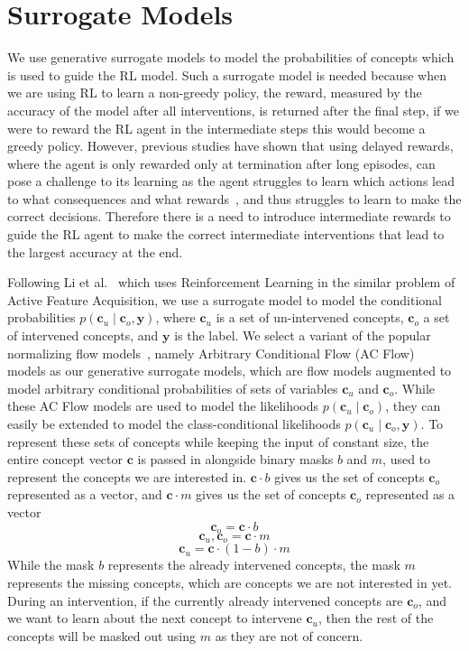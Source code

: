 
\section{Surrogate Models}\label{method:surrogate}

We use generative surrogate models to model the probabilities of concepts which is used
to guide the RL model. 
Such a surrogate model is needed because
when we are using RL to learn 
a non-greedy policy, the reward, measured by the accuracy
of the model after all interventions, is returned after the final step,
if we were to reward the RL agent in the intermediate steps
this would become a greedy policy. However, previous studies have shown that
using delayed rewards, where the agent is only rewarded only
at termination after long episodes,
can pose a challenge to its learning as the agent struggles to learn
which actions lead to what consequences and what
rewards~\cite{ steps-towards-ai, temporal-credit-assignment},
and thus struggles to learn to make the correct decisions.
Therefore there is a need to introduce intermediate rewards 
to guide the RL agent to make the correct intermediate
interventions that lead 
to the largest accuracy at the end.

Following Li et al.~\cite{afa} which uses Reinforcement 
Learning
in the similar problem of Active Feature Acquisition, we use a surrogate model 
to model
the conditional probabilities $p(\mathbf{c}_u \mid \mathbf{c}_o, \mathbf{y})$, 
where $\mathbf{c}_u$ is a set of un-intervened
concepts, $\mathbf{c}_o$ a set of intervened concepts,
and $\mathbf{y}$ is the label. We select a variant of the popular normalizing flow models~\cite{normalizing-flows},
namely Arbitrary Conditional Flow (AC Flow)~\cite{acflow}
models as our generative surrogate models, 
which are flow models augmented to model arbitrary conditional probabilities of sets of variables $\mathbf{c}_u$ and $\mathbf{c}_o$.
While these AC Flow models are used to model the likelihoods
$p(\mathbf{c}_u \mid \mathbf{c}_o)$, they can easily be extended to model the class-conditional
likelihoods
$p(\mathbf{c}_u \mid \mathbf{c}_o, \mathbf{y})$. To represent
these sets of concepts while keeping the input of constant size,
the entire concept vector $\mathbf{c}$ is passed in alongside
binary masks $b$ and $m$, used to represent the concepts we are interested in. $\mathbf{c} \cdot b$ gives us 
the set of concepts $\mathbf{c}_o$ represented as a vector,
and $\mathbf{c} \cdot m$ gives us 
the set of concepts $\mathbf{c}_o$ represented as a vector
\[\mathbf{c}_o = \mathbf{c} \cdot b\]
\[\mathbf{c}_u, \mathbf{c}_o = \mathbf{c} \cdot m\]
\[\mathbf{c}_u = \mathbf{c} \cdot (1 - b) \cdot m\]
While the mask $b$ represents
the already intervened concepts, the mask $m$ represents
the missing concepts, which are concepts we are not interested
in yet. During an intervention, if the currently
already intervened concepts are $\mathbf{c}_o$,
and we want to learn about the next concept to intervene
$\mathbf{c}_u$, then the rest of the concepts 
will be masked out using $m$ as they are not of concern.

